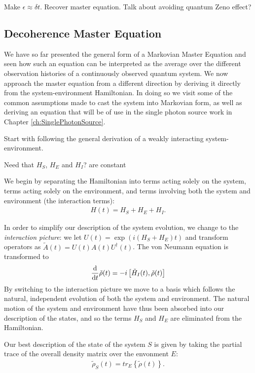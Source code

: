 Make $\epsilon \approx \delta t$. Recover master equation. Talk about avoiding quantum Zeno effect? 


\subsection{Decoherence Master Equation}

We have so far presented the general form of a Markovian Master Equation and seen how such an equation can be interpreted as the average over the different observation histories of a continuously observed quantum system. We now approach the master equation from a different direction by deriving it directly from the system-environment Hamiltonian. In doing so we visit some of the common assumptions made to cast the system into Markovian form, as well as deriving an equation that will be of use in the single photon source work in Chapter \ref{ch:SinglePhotonSource}.

Start with following the general derivation of a weakly interacting system-environment.

Need that $H_S$, $H_E$ and $H_I$? are constant

We begin by separating the Hamiltonian into terms acting solely on the system, terms acting solely on the environment, and terms involving both the system and environment (the interaction terms):
\begin{align}
  H(t) = H_S + H_E + H_I.
\end{align}

In order to simplify our description of the system evolution, we change to the \textit{interaction picture}: we let $U(t) = \exp(i(H_S + H_E)t)$ and transform operators as $\tilde{A}(t) = U(t)A(t)U^\dagger(t)$. The von Neumann equation is transformed to
\begin{align}
  \label{i_von_neumann_eq}
  \frac{\mathrm{d}}{\mathrm{d}t} \tilde{\rho}(t) = -i\left[ \tilde{H}_I(t), \tilde{\rho}(t) \right]
\end{align}
By switching to the interaction picture we move to a basis which follows the natural, independent evolution of both the system and environment. The natural motion of the system and environment have thus been absorbed into our description of the states, and so the terms $H_S$ and $H_E$ are eliminated from the Hamiltonian.

Our best description of the state of the system $S$ is given by taking the partial trace of the overall density matrix over the envonment $E$:
\begin{align}
  \label{trace_eq}
  \tilde{\rho}_S(t) = tr_E\left\{\tilde{\rho}(t)\right\}.
\end{align}

